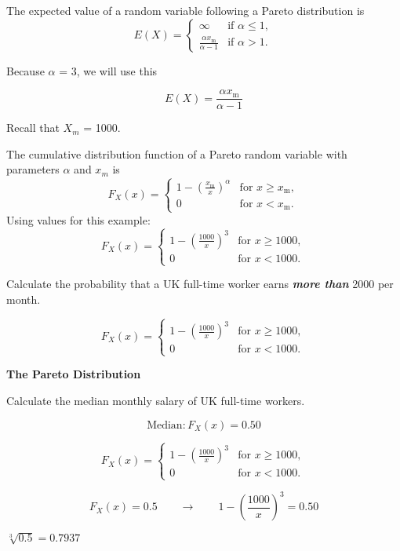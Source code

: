 \documentclass[]{report}
\begin{document}
{{The expected value of a random variable following a Pareto distribution is
\[E(X)= \begin{cases} \infty & \mbox{if }\alpha\le 1, \\ \frac{\alpha x_\mathrm{m}}{\alpha-1} & \mbox{if }\alpha>1. \end{cases}
\]


Because \textbf{$\alpha$} = $3$, we will use this
{

\[
E(X)= \frac{\alpha x_\mathrm{m}}{\alpha-1}   
\]
}
Recall that $X_m$ = 1000.

The cumulative distribution function of a Pareto random variable with parameters $\alpha$ and $x_m$ is
\[
F_X(x) = \begin{cases}
1-\left(\frac{x_\mathrm{m}}{x}\right)^\alpha & \mbox{for } x \ge x_\mathrm{m}, \\
0 & \mbox{for }x < x_\mathrm{m}.
\end{cases}
\]
Using values for this example:
\[
F_X(x) = \begin{cases}
1-\left(\frac{1000}{x}\right)^3 & \mbox{for } x \ge 1000, \\
0 & \mbox{for }x < 1000.
\end{cases}
\]




Calculate the probability that a UK full-time worker earns \textit{\textbf{more than}} 2000 per month.
{

\[
F_X(x) = \begin{cases}
1-\left(\frac{1000}{x}\right)^3 & \mbox{for } x \ge 1000, \\
0 & \mbox{for }x < 1000.
\end{cases}
\]
}

\noindent \textbf{The Pareto Distribution}

Calculate the median monthly salary of UK full-time workers.

\[ \mbox{Median}: F_X(x) = 0.50\]

{

\[
F_X(x) = \begin{cases}
1-\left(\frac{1000}{x}\right)^3 & \mbox{for } x \ge 1000, \\
0 & \mbox{for }x < 1000.
\end{cases}
\]
}




\[ F_X(x) = 0.5 \qquad \rightarrow \qquad 1-\left(\frac{1000}{x}\right)^3 = 0.50\]


$ \sqrt[3]{0.5} = 0.7937 $



}}
\end{document}
